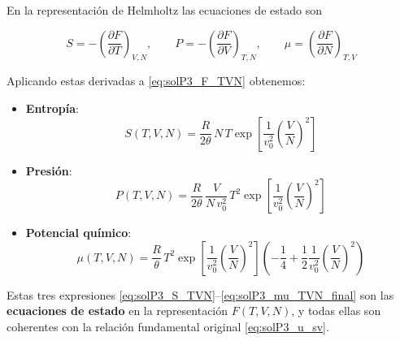 \documentclass{article}
\begin{document}
\vspace{0.3cm}

En la representación de Helmholtz las ecuaciones de estado son

\begin{equation}
S = -\left(\frac{\partial F}{\partial T}\right)_{V,N},
\qquad
P = -\left(\frac{\partial F}{\partial V}\right)_{T,N},
\qquad
\mu = \left(\frac{\partial F}{\partial N}\right)_{T,V}
\label{eq:solP3_eos_F}
\end{equation}

Aplicando estas derivadas a \eqref{eq:solP3_F_TVN} obtenemos:

\begin{itemize}
  \item[\(\bullet\)] \textcolor{Apple Green}{\textbf{Entropía}}:
  \begin{equation}
  \boxed{
  S(T,V,N)
  = \frac{R}{2\theta}\,N\,T
    \exp\!\left[\frac{1}{v_{0}^{2}}\left(\frac{V}{N}\right)^{2}\right]
  }
  \label{eq:solP3_S_TVN}
  \end{equation}

  \item[\(\bullet\)] \textcolor{Cinnabar}{\textbf{Presión}}:
  \begin{equation}
  \boxed{
  P(T,V,N)
  = \frac{R}{2\theta}\,
    \frac{V}{N\,v_{0}^{2}}\,
    T^{2}
    \exp\!\left[\frac{1}{v_{0}^{2}}\left(\frac{V}{N}\right)^{2}\right]
  }
  \label{eq:solP3_P_TVN_final}
  \end{equation}

  \item[\(\bullet\)] \textcolor{Lochinvar}{\textbf{Potencial químico}}:
  \begin{equation}
  \boxed{
  \mu(T,V,N)
  = \frac{R}{\theta}\,T^{2}
    \exp\!\left[\frac{1}{v_{0}^{2}}\left(\frac{V}{N}\right)^{2}\right]
    \left(
      -\frac{1}{4}
      + \frac{1}{2}\frac{1}{v_{0}^{2}}\left(\frac{V}{N}\right)^{2}
    \right)
  }
  \label{eq:solP3_mu_TVN_final}
  \end{equation}
\end{itemize}

Estas tres expresiones \eqref{eq:solP3_S_TVN}–\eqref{eq:solP3_mu_TVN_final} son las
\textcolor{trueblue}{\textbf{ecuaciones de estado}} en la representación \(F(T,V,N)\), y todas ellas
son coherentes con la relación fundamental original \eqref{eq:solP3_u_sv}.
\end{document}
